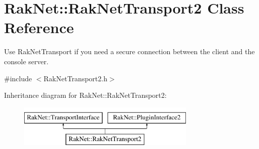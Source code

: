 \hypertarget{class_rak_net_1_1_rak_net_transport2}{\section{Rak\-Net\-:\-:Rak\-Net\-Transport2 Class Reference}
\label{class_rak_net_1_1_rak_net_transport2}
}


Use Rak\-Net\-Transport if you need a secure connection between the client and the console server.  




{\ttfamily \#include $<$Rak\-Net\-Transport2.\-h$>$}

Inheritance diagram for Rak\-Net\-:\-:Rak\-Net\-Transport2\-:\begin{figure}[H]
\begin{center}
\leavevmode
\includegraphics[height=2.000000cm]{class_rak_net_1_1_rak_net_transport2}
\end{center}
\end{figure}
